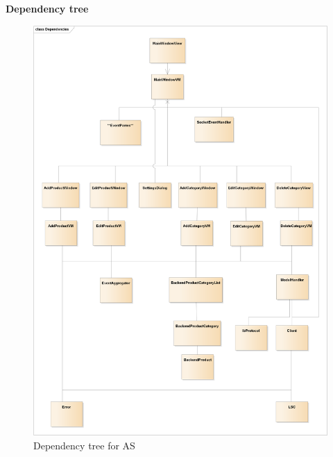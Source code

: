 \newpage
\textbf{Dependency tree}
\begin{figure}[H]
	\centering
	\includegraphics[width=1\textwidth]{Test/Integrationstest/Images/AS-Dependencies}
	\caption{Dependency tree for \gls{AS}}
	\label{fig:AS-dependencies}
\end{figure}

